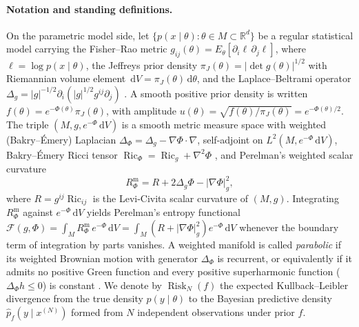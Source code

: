 \documentclass[a4paper,11pt,noarxiv]{quantumarticle}
\newcommand{\R}{\mathbb{R}}
\newcommand{\Rm}{R^{\mathrm m}}
\newcommand{\Risk}{\operatorname{Risk}}
\newcommand{\abs}[1]{\lvert #1\rvert}
\newcommand{\dd}{\,\mathrm{d}}
\newcommand{\grad}{\nabla}
\DeclareMathOperator{\Ric}{Ric}
\theoremstyle{plain}
\theoremstyle{definition}
\theoremstyle{remark}
\begin{document}
\paragraph{Notation and standing definitions.}
On the parametric model side, let $\{p(x\mid\theta):\theta\in M\subset\R^d\}$
be a regular statistical model carrying the Fisher--Rao metric
$g_{ij}(\theta)=E_\theta[\partial_i\ell\,\partial_j\ell]$, where
$\ell=\log p(x\mid\theta)$, the Jeffreys prior density
$\pi_J(\theta)=\abs{\det g(\theta)}^{1/2}$ with Riemannian volume
element $\dd V=\pi_J(\theta)\dd\theta$, and the Laplace--Beltrami
operator $\Delta_g=\abs{g}^{-1/2}\partial_i(\abs{g}^{1/2}g^{ij}\partial_j)$
\cite{amari2000}. A smooth positive prior density is written
$f(\theta)=e^{-\Phi(\theta)}\pi_J(\theta)$, with amplitude
$u(\theta)=\sqrt{f(\theta)/\pi_J(\theta)}=e^{-\Phi(\theta)/2}$. The
triple $(M,g,e^{-\Phi}\dd V)$ is a smooth metric measure space with
weighted (Bakry--\'Emery) Laplacian
$\Delta_\Phi=\Delta_g-\grad\Phi\cdot\grad$, self-adjoint on
$L^2(M,e^{-\Phi}\dd V)$, Bakry--\'Emery Ricci tensor
$\Ric_\Phi=\Ric_g+\grad^2\Phi$ \cite{bakryemery1985}, and Perelman's
weighted scalar curvature \cite{perelman2002}
\begin{equation}\label{eq:perelman}
\Rm_\Phi=R+2\Delta_g\Phi-\abs{\grad\Phi}_g^2,
\end{equation}
where $R=g^{ij}\Ric_{ij}$ is the Levi-Civita scalar curvature of
$(M,g)$. Integrating $\Rm_\Phi$ against $e^{-\Phi}\dd V$ yields
Perelman's entropy functional
$\mathcal F(g,\Phi)=\int_M\Rm_\Phi\,e^{-\Phi}\dd V
=\int_M(R+\abs{\grad\Phi}_g^2)e^{-\Phi}\dd V$ whenever the boundary
term of integration by parts vanishes. A weighted manifold is called
\emph{parabolic} if its weighted Brownian motion with generator
$\Delta_\Phi$ is recurrent, or equivalently if it admits no positive
Green function and every positive superharmonic function
($\Delta_\Phi h\le0$) is constant \cite[\S5]{grigoryan1999}. We denote
by $\Risk_N(f)$ the expected Kullback--Leibler divergence from the true
density $p(y\mid\theta)$ to the Bayesian predictive density
$\hat p_f(y\mid x^{(N)})$ formed from $N$ independent observations
under prior $f$.
\end{document}
